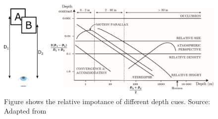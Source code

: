 \begin{figure}[h!]
\centering
\includegraphics[width=0.99\columnwidth]{images/other/cutting_and_vishton}
\caption[Relative importance of depth cues]{Figure shows the relative impotance of different depth cues. Source: Adapted from \cite{cutting1995perceiving}}
\label{fig:cutting_and_vishton}
\end{figure}

